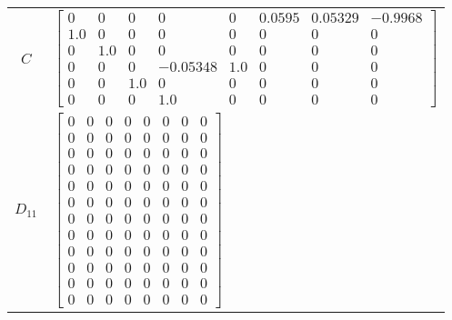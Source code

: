 \begin{tabular}{cl}
   $C$    & $\left[\begin{matrix}0 & 0 & 0 & 0 & 0 & 0.0595 & 0.05329 & -0.9968\\1.0 & 0 & 0 & 0 & 0 & 0 & 0 & 0\\0 & 1.0 & 0 & 0 & 0 & 0 & 0 & 0\\0 & 0 & 0 & -0.05348 & 1.0 & 0 & 0 & 0\\0 & 0 & 1.0 & 0 & 0 & 0 & 0 & 0\\0 & 0 & 0 & 1.0 & 0 & 0 & 0 & 0\end{matrix}\right]$                                                                                                                                                                                                                                                                                                                                                                                                                                                                                                       \\
 $D_{11}$ & $\left[\begin{matrix}0 & 0 & 0 & 0 & 0 & 0 & 0 & 0\\0 & 0 & 0 & 0 & 0 & 0 & 0 & 0\\0 & 0 & 0 & 0 & 0 & 0 & 0 & 0\\0 & 0 & 0 & 0 & 0 & 0 & 0 & 0\\0 & 0 & 0 & 0 & 0 & 0 & 0 & 0\\0 & 0 & 0 & 0 & 0 & 0 & 0 & 0\\0 & 0 & 0 & 0 & 0 & 0 & 0 & 0\\0 & 0 & 0 & 0 & 0 & 0 & 0 & 0\\0 & 0 & 0 & 0 & 0 & 0 & 0 & 0\\0 & 0 & 0 & 0 & 0 & 0 & 0 & 0\\0 & 0 & 0 & 0 & 0 & 0 & 0 & 0\\0 & 0 & 0 & 0 & 0 & 0 & 0 & 0\end{matrix}\right]$                                                                                                                                                                                                                                                                                                                                               \\

\end{tabular}
